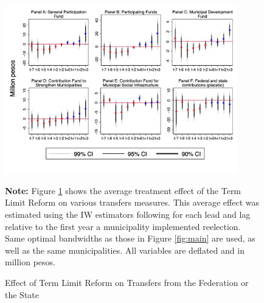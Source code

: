 \documentclass[12pt]{amsart}
\numberwithin{equation}{section}
\theoremstyle{definition}
\theoremstyle{definition}
\theoremstyle{definition}
\begin{document}
 \begin{figure}[h]   
\centering
 \caption{Effect of Term Limit Reform on Transfers from the Federation or the State}
 \label{fig:resources2}
\includegraphics[width=0.9\textwidth]{../Figures_incumbency/resouce_based_incumbency_allyears.png}
       \captionsetup{justification=centering}
         
 \textbf{Note:} Figure \ref{fig:resources2} shows the average treatment effect of the Term Limit Reform on various transfers measures. This average effect was estimated using the IW estimators following \citet{abraham_sun_2020} for each lead and lag relative to the first year a municipality implemented reelection. Same optimal bandwidths as those in Figure \ref{fig:main} are used, as well as the same municipalities. All variables are deflated and in million pesos.   
       
\end{figure}  
\end{document}

